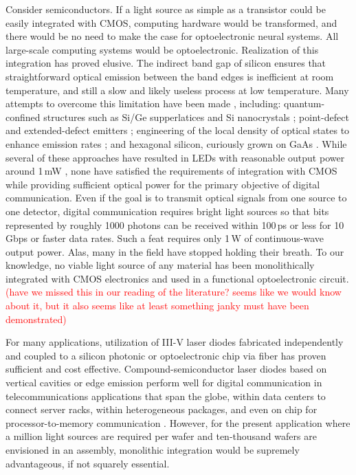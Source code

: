 \documentclass[twocolumn]{article}
\begin{document}
Consider semiconductors. If a light source as simple as a transistor could be easily integrated with CMOS, computing hardware would be transformed, and there would be no need to make the case for optoelectronic neural systems. All large-scale computing systems would be optoelectronic. Realization of this integration has proved elusive. The indirect band gap of silicon ensures that straightforward optical emission between the band edges is inefficient at room temperature, and still a slow and likely useless process at low temperature. Many attempts to overcome this limitation have been made \cite{shxu2007}, including: quantum-confined structures such as Si/Ge supperlatices and Si nanocrystals \cite{}; point-defect \cite{} and extended-defect emitters \cite{}; engineering of the local density of optical states to enhance emission rates \cite{}; and hexagonal silicon, curiously grown on GaAs \cite{}. While several of these approaches have resulted in LEDs with reasonable output power around 1\,mW \cite{}, none have satisfied the requirements of integration with CMOS while providing sufficient optical power for the primary objective of digital communication. Even if the goal is to transmit optical signals from one source to one detector, digital communication requires bright light sources so that bits represented by roughly 1000 photons can be received within 100\,ps or less for 10\,Gbps or faster data rates. Such a feat requires only 1\,\textmu W of continuous-wave output power. Alas, many in the field have stopped holding their breath. To our knowledge, no viable light source of any material has been monolithically integrated with CMOS electronics and used in a functional optoelectronic circuit. \textcolor{red}{(have we missed this in our reading of the literature? seems like we would know about it, but it also seems like at least something janky must have been demonstrated)}

For many applications, utilization of III-V laser diodes fabricated independently and coupled to a silicon photonic or optoelectronic chip via fiber has proven sufficient and cost effective. Compound-semiconductor laser diodes based on vertical cavities or edge emission perform well for digital communication in telecommunications applications that span the globe, within data centers to connect server racks, within heterogeneous packages, and even on chip for processor-to-memory communication \cite{}. However, for the present application where a million light sources are required per wafer and ten-thousand wafers are envisioned in an assembly, monolithic integration would be supremely advantageous, if not squarely essential. 
\end{document}
